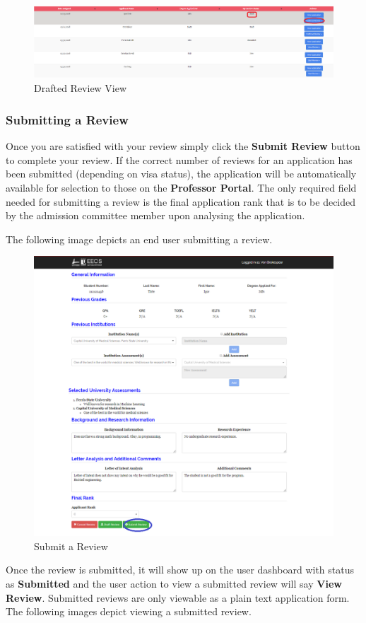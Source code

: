 \documentclass[fontsize=12pt,paper=letter,twoside]{scrartcl}
\begin{document}
\begin{figure}[!htb]
\begin{center}
\includegraphics[width=.9\textwidth]{images/cm/drafted_review.png}
\end{center}
\caption{Drafted Review View}
\label{fig:cm:drafted_review}
\end{figure}

\clearpage
\subsubsection{Submitting a Review}
Once you are satisfied with your review simply  click the \textbf{Submit Review} button to complete your review. If the correct number of reviews for an application has been submitted (depending on visa status), the application will be automatically available for selection to those on the \textbf{Professor Portal}. The only required field needed for submitting a review is the final application rank that is to be decided by the admission committee member upon analysing the application.

\bigskip
\noindent The following image depicts an end user submitting a review. 

\begin{figure}[!htb]
\begin{center}
\includegraphics[width=.8\textwidth]{images/cm/submit_review.png}
\end{center}
\caption{Submit a Review}
\label{fig:cm:submit_review}
\end{figure}
\clearpage
\bigskip
\noindent Once the review is submitted, it will show up on the user dashboard with status as \textbf{Submitted} and the user action to view a submitted review will say \textbf{View Review}. Submitted reviews are only viewable as a plain text application form. The following images depict viewing a submitted review.
\end{document}
